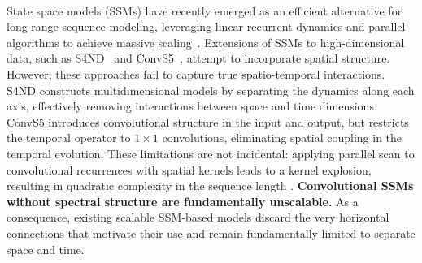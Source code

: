 \documentclass{article}
\begin{document}
\paragraph{} State space models (SSMs) have recently emerged as an efficient alternative for long-range sequence modeling, leveraging linear recurrent dynamics and parallel algorithms to achieve massive scaling~\citep{gu2022,gu2022s4d,smith2023s5,gu2023,dao2024}. Extensions of SSMs to high-dimensional data, such as S4ND~\citep{nguyen2022} and ConvS5~\citep{smith2023convs5}, attempt to incorporate spatial structure. However, these approaches fail to capture true spatio-temporal interactions.
%
S4ND constructs multidimensional models by separating the dynamics along each axis, effectively removing interactions between space and time dimensions. ConvS5 introduces convolutional structure in the input and output, but restricts the temporal operator to $1\times 1$ convolutions, eliminating spatial coupling in the temporal evolution.
%
These limitations are not incidental: applying parallel scan to convolutional recurrences with spatial kernels leads to a kernel explosion, resulting in quadratic complexity in the sequence length . \textbf{Convolutional SSMs without spectral structure are fundamentally unscalable.} As a consequence, existing scalable SSM-based models discard the very horizontal connections that motivate their use and remain fundamentally limited to separate space and time.
\end{document}
